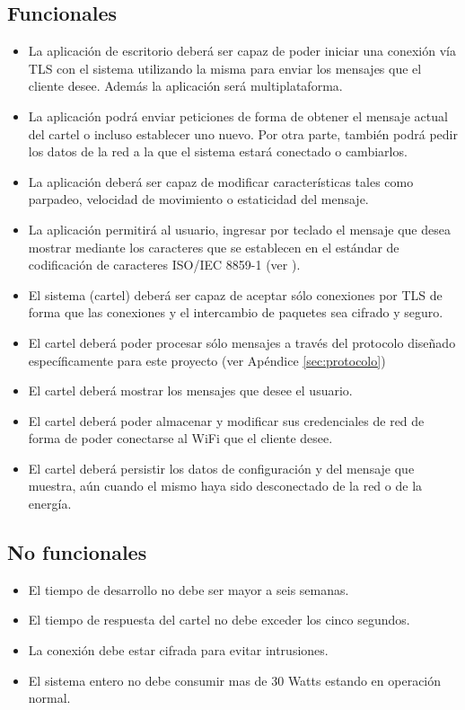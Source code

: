 \subsection{Funcionales}
\begin{itemize}
	\item La aplicación de escritorio deberá ser capaz de poder iniciar una conexión vía TLS con el sistema utilizando la misma para enviar los mensajes que el cliente desee. Además la aplicación será multiplataforma.
	\item La aplicación podrá enviar peticiones de forma de obtener el mensaje actual del cartel o incluso establecer uno nuevo. Por otra parte, también podrá pedir los datos de la red a la que el sistema estará conectado o cambiarlos.
	\item La aplicación deberá ser capaz de modificar características tales como parpadeo, velocidad de movimiento o estaticidad del mensaje.
	\item La aplicación permitirá al usuario, ingresar por teclado el mensaje que desea mostrar mediante los caracteres que se establecen en el estándar de codificación de caracteres ISO/IEC 8859-1 (ver \cite{CodifChar}).
	\item El sistema (cartel) deberá ser capaz de aceptar sólo conexiones por TLS\cite{TLS} de forma que las conexiones y el intercambio de paquetes sea cifrado y seguro.
	\item El cartel deberá poder procesar sólo mensajes a través del protocolo diseñado específicamente para este proyecto (ver Apéndice \ref{sec:protocolo})
	\item El cartel deberá mostrar los mensajes que desee el usuario.
	\item El cartel deberá poder almacenar y modificar sus credenciales de red de forma de poder conectarse al WiFi que el cliente desee.
	\item El cartel deberá persistir los datos de configuración y del mensaje que muestra, aún cuando el mismo haya sido desconectado de la red o de la energía.
\end{itemize}

\subsection{No funcionales}
\begin{itemize}
	\item El tiempo de desarrollo no debe ser mayor a seis semanas.
	\item El tiempo de respuesta del cartel no debe exceder los cinco segundos.
	\item La conexión debe estar cifrada para evitar intrusiones.
	\item El sistema entero no debe consumir mas de 30 Watts estando en operación normal.
\end{itemize}

